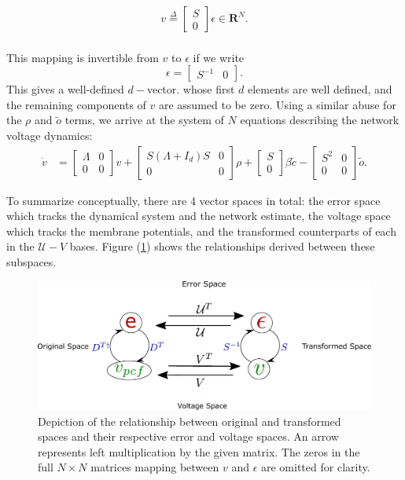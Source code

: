 \begin{enumerate}
\begin{align}
\label{eq:rotated_voltage_def}
v \overset{\Delta}{=} \begin{bmatrix}
S \\ 0
\end{bmatrix} \epsilon \in \mathbf{R}^N.
\end{align}
\\
This mapping is invertible from $v$ to $\epsilon$ if we write  
$$
\epsilon = \begin{bmatrix} S^{-1} & 0 \end{bmatrix}.
$$
This gives a well-defined $d-$vector. whose first $d$ elements are well defined, and the remaining components of $v$ are assumed to be zero. Using a similar abuse for the $\rho$ and $\tilde{o}$ terms, we arrive at the system of $N$ equations describing the network voltage dynamics:
\begin{align}
\label{eq:rotated_voltage_dynamics}
\dot{v}
&= 
\begin{bmatrix}
\Lambda & 0
\\
0 & 0
\end{bmatrix}
v +
\begin{bmatrix}
S \left(\Lambda + I_d \right) S & 0
\\
0 & 0
\end{bmatrix}
  \rho 
  +
\begin{bmatrix}
S \\ 0
\end{bmatrix}  
\beta \tilde{c}
  - 
 \begin{bmatrix}
S^2 & 0
\\
0 & 0
\end{bmatrix}
    \tilde{o}.
\end{align}

To summarize conceptually, there are 4 vector spaces in total: the error space which tracks the dynamical system and the network estimate, the voltage space which tracks the membrane potentials, and the transformed counterparts of each in the $\mathcal{U}-V$ bases. Figure (\ref{fig:four_subspace_relation}) shows the relationships derived between these subspaces.

\begin{figure}[h]
\centering
\includegraphics[width=\linewidth]{figures/ev_rotated_classic_graph}
\caption{Depiction of the relationship between original and transformed spaces and their respective error and voltage spaces. An arrow represents left multiplication by the given matrix. The zeros in the full $N \times N$ matrices mapping between $v$ and $\epsilon$ are omitted for clarity.}
\label{fig:four_subspace_relation}
\end{figure}
\end{enumerate}   
\clearpage
   
